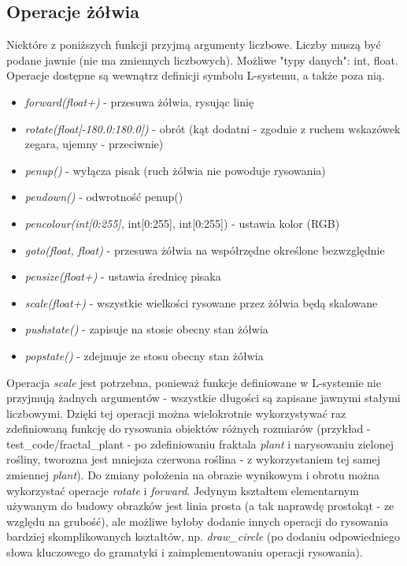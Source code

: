 \documentclass{article}
\begin{document}
\subsection{Operacje żółwia}
Niektóre z poniższych funkcji przyjmą argumenty liczbowe. Liczby muszą być podane jawnie (nie ma zmiennych liczbowych). Możliwe "typy danych": int, float.
Operacje dostępne są wewnątrz definicji symbolu L-systemu, a także poza nią.
\begin{itemize}
    \item{\textit{forward(float+)} - przesuwa żółwia, rysując linię}
    \item{\textit{rotate(float[-180.0:180.0])} - obrót (kąt dodatni - zgodnie z ruchem wskazówek zegara, ujemny - przeciwnie)}
    \item{\textit{penup()} - wyłącza pisak (ruch żółwia nie powoduje rysowania)}
    \item{\textit{pendown()} - odwrotność penup()}
    \item{\textit{pencolour(int[0:255],} int[0:255], int[0:255]) - ustawia kolor (RGB)}
    \item{\textit{goto(float, float)} - przesuwa żółwia na współrzędne określone bezwzględnie}
    \item{\textit{pensize(float+)} - ustawia średnicę pisaka}
    \item{\textit{scale(float+)} - wszystkie wielkości rysowane przez żółwia będą skalowane}
    \item{\textit{pushstate()} - zapisuje na stosie obecny stan żółwia}
    \item{\textit{popstate()} - zdejmuje ze stosu obecny stan żółwia}
\end{itemize}
Operacja \textit{scale} jest potrzebna, ponieważ funkcje definiowane w L-systemie nie przyjmują żadnych argumentów - wszystkie długości są zapisane jawnymi stałymi liczbowymi. Dzięki tej operacji można wielokrotnie wykorzystywać raz zdefiniowaną funkcję do rysowania obiektów różnych rozmiarów (przykład - test\_code/fractal\_plant - po zdefiniowaniu fraktala \textit{plant} i narysowaniu zielonej rośliny, tworozna jest mniejsza czerwona roślina - z wykorzystaniem tej samej zmiennej \textit{plant}). Do zmiany położenia na obrazie wynikowym i obrotu można wykorzystać operacje \textit{rotate} i \textit{forward}. Jedynym kształtem elementarnym używanym do budowy obrazków jest linia prosta (a tak naprawdę prostokąt - ze względu na grubość), ale możliwe byłoby dodanie innych operacji do rysowania bardziej skomplikowanych kształtów, np. \textit{draw\_circle} (po dodaniu odpowiedniego słowa kluczowego do gramatyki i zaimplementowaniu operacji rysowania).
\end{document}
